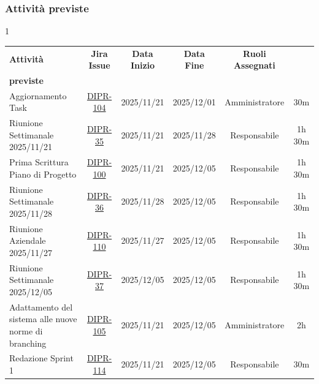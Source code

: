 \documentclass[a4paper,12pt]{article}
\begin{document}
\subsubsection{Attività previste}

    \small
    \begin{spacing}{1}
        \begin{longtable}{|p{4cm}|c|c|c|c|c|}
            \hline
            \rowcolor{zpusgreen!30}
            \textbf{Attività} & \textbf{Jira Issue} & \textbf{Data Inizio} & \textbf{Data Fine} & \textbf{Ruoli Assegnati} & \begin{tabular}[c]{@{}c@{}} \textbf{Ore} \\ \textbf{previste} \end{tabular} \\
            \hline
            Aggiornamento Task & \href{https://7zpus.atlassian.net/browse/DIPR-104}{DIPR-104} & 2025/11/21 & 2025/12/01 & Amministratore & 30m \\
            \hline
            Riunione Settimanale 2025/11/21 & \href{https://7zpus.atlassian.net/browse/DIPR-35}{DIPR-35} & 2025/11/21 & 2025/11/28 & Responsabile & 1h 30m\\
            \hline
            Prima Scrittura Piano di Progetto & \href{https://7zpus.atlassian.net/browse/DIPR-100}{DIPR-100} & 2025/11/21 & 2025/12/05 & Responsabile & 1h 30m\\
            \hline
            Riunione Settimanale 2025/11/28 & \href{https://7zpus.atlassian.net/browse/DIPR-36}{DIPR-36} & 2025/11/28 & 2025/12/05 & Responsabile & 1h 30m \\
            \hline
            Riunione Aziendale 2025/11/27 & \href{https://7zpus.atlassian.net/browse/DIPR-110}{DIPR-110} & 2025/11/27 & 2025/12/05 & Responsabile & 1h 30m \\ %
            \hline
            Riunione Settimanale 2025/12/05 & \href{https://7zpus.atlassian.net/browse/DIPR-37}{DIPR-37} & 2025/12/05 & 2025/12/05 & Responsabile & 1h 30m \\ 
            \hline
            Adattamento del sistema alle nuove norme di branching & \href{https://7zpus.atlassian.net/browse/DIPR-105}{DIPR-105} & 2025/11/21 & 2025/12/05 & Amministratore & 2h \\ %
            \hline
            Redazione Sprint 1 & \href{https://7zpus.atlassian.net/browse/DIPR-114}{DIPR-114} & 2025/11/21 & 2025/12/05 & Responsabile & 30m \\

\end{longtable}
\end{spacing}
\end{document}
